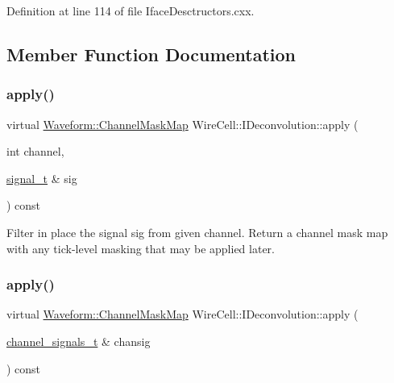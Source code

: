 Definition at line 114 of file Iface\+Desctructors.\+cxx.



\subsection{Member Function Documentation}
\mbox{\label{class_wire_cell_1_1_i_deconvolution_af13ec8cf283e1c21da9530329060565f}} 
\subsubsection{\texorpdfstring{apply()}{apply()}\hspace{0.1cm}{\footnotesize\ttfamily [1/2]}}
{\footnotesize\ttfamily virtual \hyperlink{namespace_wire_cell_1_1_waveform_a18b9ae61c858e340252ba3ac83ac3bc0}{Waveform\+::\+Channel\+Mask\+Map} Wire\+Cell\+::\+I\+Deconvolution\+::apply (\begin{DoxyParamCaption}\item[{int}]{channel,  }\item[{\hyperlink{class_wire_cell_1_1_i_deconvolution_a8b4391e337dad4e658a33b1a6ee3dab5}{signal\+\_\+t} \&}]{sig }\end{DoxyParamCaption}) const\hspace{0.3cm}{\ttfamily [pure virtual]}}

Filter in place the signal {\ttfamily sig} from given {\ttfamily channel}. Return a channel mask map with any tick-\/level masking that may be applied later. \mbox{\label{class_wire_cell_1_1_i_deconvolution_a4c8f7f0aecfa099a75f43d1bc3ec1c7f}} 
\subsubsection{\texorpdfstring{apply()}{apply()}\hspace{0.1cm}{\footnotesize\ttfamily [2/2]}}
{\footnotesize\ttfamily virtual \hyperlink{namespace_wire_cell_1_1_waveform_a18b9ae61c858e340252ba3ac83ac3bc0}{Waveform\+::\+Channel\+Mask\+Map} Wire\+Cell\+::\+I\+Deconvolution\+::apply (\begin{DoxyParamCaption}\item[{\hyperlink{class_wire_cell_1_1_i_deconvolution_a02ef33d767e273c9fbb9a1b27dc84f77}{channel\+\_\+signals\+\_\+t} \&}]{chansig }\end{DoxyParamCaption}) const\hspace{0.3cm}{\ttfamily [pure virtual]}}

